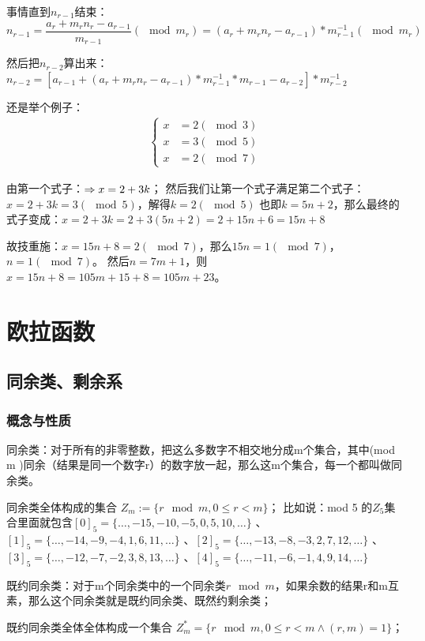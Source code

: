 \documentclass[12pt]{article}
\begin{document}
事情直到$n_{r-1}$结束：$n_{r-1}=\dfrac{a_{r}+m_{r}n_{r}-a_{r-1}}{m_{r-1}} (\mod m_{r})=(a_{r}+m_{r}n_{r}-a_{r-1})*m^{-1}_{r-1} (\mod m_{r})$

然后把$n_{r-2}$算出来：$n_{r-2}=[a_{r-1}+(a_{r}+m_{r}n_{r}-a_{r-1})*m^{-1}_{r-1}*m_{r-1}-a_{r-2}]*m^{-1}_{r-2}$


还是举个例子：
\begin{align*}
    \begin{cases}
        x&=2(\mod 3)\\
        x&=3(\mod 5)\\
        x&=2(\mod 7)
    \end{cases}
\end{align*}

由第一个式子：$\Rightarrow x = 2+3k\\$；
然后我们让第一个式子满足第二个式子：$x = 2+3k=3 (\mod 5)$，解得$k=2(\mod 5)$
也即$k=5n+2$，那么最终的式子变成：$x = 2+3k = 2+3(5n+2)=2+15n+6=15n+8$

故技重施：$x=15n+8=2(\mod 7)$，那么$15n=1(\mod 7)$，$n=1(\mod 7)$。
然后$n=7m+1$，则$x=15n+8=105m+15+8=105m+23$。

\section{欧拉函数}

\subsection{同余类、剩余系}

\subsubsection{概念与性质}

同余类：对于所有的非零整数，把这么多数字不相交地分成m个集合，其中(mod m )同余（结果是同一个数字r）的数字放一起，那么这m个集合，每一个都叫做同余类。

同余类全体构成的集合 $Z_m:=\{r\mod m,0\leq r < m\}$；
比如说：mod 5 的$Z_{5}$集合里面就包含$[0]_5=\{\dots,-15,-10,-5,0,5,10,\dots\}$
、$[1]_5=\{\dots,-14,-9,-4,1,6,11,\dots\}$
、$[2]_5=\{\dots,-13,-8,-3,2,7,12,\dots\}$
、$[3]_5=\{\dots,-12,-7,-2,3,8,13,\dots\}$
、$[4]_5=\{\dots,-11,-6,-1,4,9,14,\dots\}$


既约同余类：对于m个同余类中的一个同余类$r\mod m$，如果余数的结果r和m互素，那么这个同余类就是既约同余类、既然约剩余类；

既约同余类全体全体构成一个集合 $Z^*_m=\{r\mod m,0\leq r<m \land (r,m)=1\}$；
\end{document}
